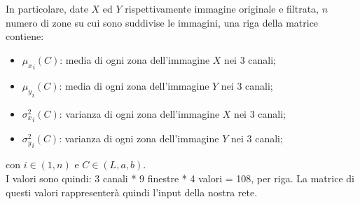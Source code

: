 \documentclass[a4paper,11pt]{article}
\begin{document}
    In particolare, date $X$ ed $Y$ rispettivamente immagine originale e filtrata, $n$ numero di zone su cui sono suddivise le immagini,
    una riga della matrice contiene: 
    \begin{itemize}
        \item ${\mu_x}_i(C)$: media di ogni zona dell'immagine $X$ nei 3 canali;
        \item ${\mu_y}_i(C)$:  media di ogni zona dell'immagine $Y$ nei 3 canali;
        \item ${\sigma^2_x}_i(C)$: varianza di ogni zona dell'immagine $X$ nei 3 canali;
        \item ${\sigma^2_y}_i(C)$: varianza di ogni zona dell'immagine $Y$ nei 3 canali;
    \end{itemize}
    con $i \in (1,n)$ e $C \in (L, a, b)$.
    \\I valori sono quindi: 3 canali * 9 finestre * 4 valori = 108, per riga.
    La matrice di questi valori rappresenterà quindi l'input della nostra rete. 
    \newpage
\end{document}
